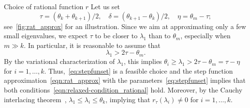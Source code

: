 \documentclass{siamart190516}
\begin{document}
\begin{paragraph}{Choice of rational function $r$}
Let us set 
\begin{equation} \label{eq:stepfunset}
  \tau = (\theta_{k} + \theta_{k+1})/2, \quad \delta = (\theta_{k+1} - \theta_{k})/2, \quad \eta = \theta_{m} - \tau;
\end{equation}
see~\cref{fig:rat_approx} for an illustration. 
Since we aim at approximating only a few small eigenvalues, we expect $\tau$ to be closer to $\lambda_1$ than to $\theta_m$, especially when $m \gg k$. In particular, it is reasonable to assume that
\[
 \lambda_{1}>2\tau-\theta_{m}.
\]
By the variational characterization of $\lambda_{1}$, this implies $\theta_{i}\geq \lambda_{1}>2\tau-\theta_{m}=\tau-\eta$ for $i = 1,\ldots,k$. Thus,~\eqref{eq:stepfunset} is a feasible choice and the step function approximation~\eqref{eqn:rat_approx} with the parameters~\eqref{eq:stepfunset} implies 
that both conditions~\cref{eqn:relaxed-condition_rational} hold.
Moreover, by the Cauchy interlacing theorem~\cite[Thm.~8.1.7]{Golub2013}, $\lambda_{1}\leq \lambda_{i} \leq \theta_{k}$, implying that $r_{\tau}(\lambda_i) \neq 0$ for $i = 1,\ldots, k$.

 \begin{figure}[htbp]
    \centering
{}
\end{figure}
\end{paragraph}
\end{document}
